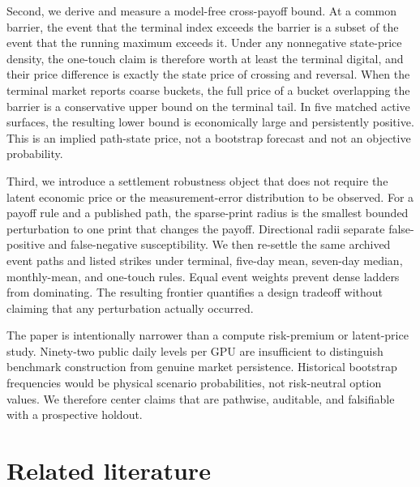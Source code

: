 \documentclass[10pt,twocolumn]{article}
\begin{document}
Second, we derive and measure a model-free cross-payoff bound. At a common
barrier, the event that the terminal index exceeds the barrier is a subset of
the event that the running maximum exceeds it. Under any nonnegative state-price
density, the one-touch claim is therefore worth at least the terminal digital,
and their price difference is exactly the state price of crossing and reversal.
When the terminal market reports coarse buckets, the full price of a bucket
overlapping the barrier is a conservative upper bound on the terminal tail. In
five matched active surfaces, the resulting lower bound is economically large
and persistently positive. This is an implied path-state price, not a bootstrap
forecast and not an objective probability.

Third, we introduce a settlement robustness object that does not require the
latent economic price or the measurement-error distribution to be observed.
For a payoff rule and a published path, the sparse-print radius is the smallest
bounded perturbation to one print that changes the payoff. Directional radii
separate false-positive and false-negative susceptibility. We then re-settle the
same archived event paths and listed strikes under terminal, five-day mean,
seven-day median, monthly-mean, and one-touch rules. Equal event weights prevent
dense ladders from dominating. The resulting frontier quantifies a design
tradeoff without claiming that any perturbation actually occurred.

The paper is intentionally narrower than a compute risk-premium or latent-price
study. Ninety-two public daily levels per GPU are insufficient to distinguish
benchmark construction from genuine market persistence. Historical bootstrap
frequencies would be physical scenario probabilities, not risk-neutral option
values. We therefore center claims that are pathwise, auditable, and falsifiable
with a prospective holdout.

\section{Related literature}
\end{document}
